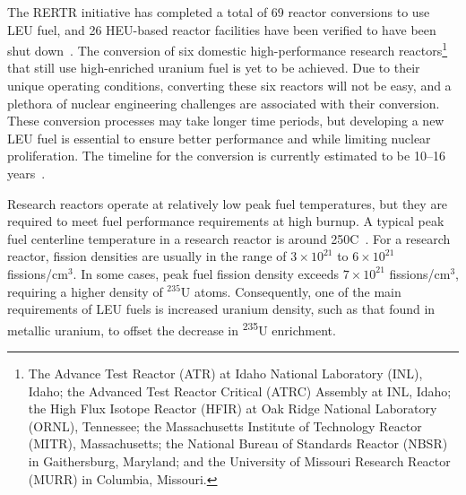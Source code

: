 The RERTR initiative has completed a total of 69 reactor conversions to use LEU fuel, and 26 HEU-based reactor facilities have been verified to have been shut down~\cite{wilson2017us}. The conversion of six domestic high-performance research reactors\footnote{The Advance Test Reactor (ATR) at Idaho National Laboratory (INL), Idaho; the Advanced Test Reactor Critical (ATRC) Assembly at INL, Idaho; the High Flux Isotope Reactor (HFIR) at Oak Ridge National Laboratory (ORNL), Tennessee;  the Massachusetts Institute of Technology Reactor (MITR), Massachusetts; the National Bureau of Standards Reactor (NBSR) in Gaithersburg, Maryland; and the University of Missouri Research Reactor (MURR) in Columbia, Missouri.} that still use high-enriched uranium fuel is yet to be achieved. Due to their unique operating conditions, converting these six reactors will not be easy, and a plethora of nuclear engineering challenges are associated with their conversion. These conversion processes may take longer time periods, but developing a new LEU fuel is essential to ensure better performance and while limiting nuclear proliferation. The timeline for the conversion is currently estimated to be 10--16 years~\cite{national2016reducing, national2012progress, kaufmann1962nuclear}. 


Research reactors operate at relatively low peak fuel temperatures, but they are required to meet fuel performance requirements at high burnup. A typical peak fuel centerline temperature in a research reactor is around 250\textdegree C~\cite{meyer2014irradiation}. For a research reactor, fission densities are usually in the range of $3\times10^{21}$ to $6\times10^{21}$ fissions/cm$^3$. In some cases, peak fuel fission density exceeds $7\times10^{21}$ fissions/cm$^3$, requiring a higher density of $^{235}$U atoms. Consequently, one of the main requirements of LEU fuels is increased uranium density, such as that found in metallic uranium, to offset the decrease in \textsuperscript{235}U enrichment. 

